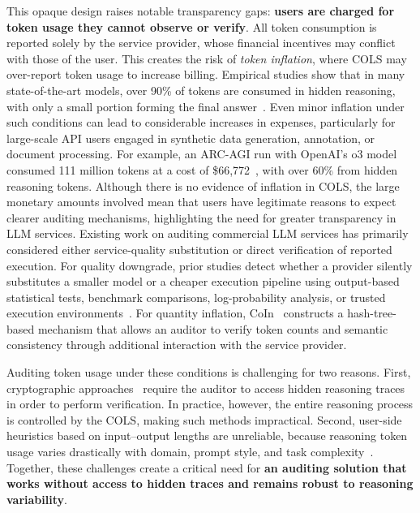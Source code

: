\documentclass[pdflatex,sn-mathphys-num]{sn-jnl}%
\theoremstyle{thmstyleone}%
\theoremstyle{thmstyletwo}%
\theoremstyle{thmstylethree}%
\providecommand{\DIFaddend}{} %
\begin{document}
\DIFaddend This opaque design raises notable transparency gaps: \textbf{users are charged for token usage they cannot observe or verify}. All token consumption is reported solely by the service provider, whose financial incentives may conflict with those of the user. This creates the risk of \textit{token inflation}, where COLS may over-report token usage to increase billing.
Empirical studies show that in many state-of-the-art models, over 90\% of tokens are consumed in hidden reasoning, with only a small portion forming the final answer~\citep{sun2025coin}. Even minor inflation under such conditions can lead to considerable increases in expenses, particularly for large-scale API users engaged in synthetic data generation, annotation, or document processing.
For example, an ARC-AGI run with OpenAI's o3 model consumed 111 million tokens at a cost of \$66,772~\citep{chollet2025o3}, with over 60\% from hidden reasoning tokens. Although there is no evidence of inflation in COLS, the large monetary amounts involved mean that users have legitimate reasons to expect clearer auditing mechanisms, highlighting the need for greater transparency in LLM services. Existing work on auditing commercial LLM services has primarily considered either service-quality substitution or direct verification of reported execution. For quality downgrade, prior studies detect whether a provider silently substitutes a smaller model or a cheaper execution pipeline using output-based statistical tests, benchmark comparisons, log-probability analysis, or trusted execution environments~\citep{cai2025you,yuan2025trust,nvidia2023confidential}. For quantity inflation, CoIn~\citep{sun2025coin} constructs a hash-tree-based mechanism that allows an auditor to verify token counts and semantic consistency through
additional interaction with the service provider.

Auditing token usage under these conditions is challenging for two reasons. First, cryptographic approaches~\citep{sun2025coin} require the auditor to access hidden reasoning traces in order to perform verification. In practice, however, the entire reasoning process is controlled by the COLS, making such methods impractical. Second, user-side heuristics based on input–output lengths are unreliable, because reasoning token usage varies drastically with domain, prompt style, and task complexity~\citep{jin2024impact}. Together, these challenges create a critical need for \textbf{an auditing solution that works without access to hidden traces and remains robust to reasoning variability}.
\end{document}
